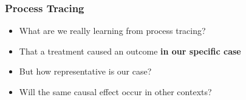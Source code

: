 \documentclass[xcolor=x11names,compress]{beamer}\usepackage[]{graphicx}\usepackage[]{color}
\renewcommand{\(}{\begin{columns}}
\renewcommand{\)}{\end{columns}}
\newcommand{\<}[1]{\begin{column}{#1}}
\renewcommand{\>}{\end{column}}
\begin{document}
\begin{frame}
\frametitle{Process Tracing}
\begin{itemize}
\item What are we really learning from process tracing?
\pause
\item That a treatment caused an outcome \textbf{in our specific case}
\pause
\item But how representative is our case?
\pause
\item Will the same causal effect occur in other contexts?
\end{itemize}
\end{frame}

\end{document}

